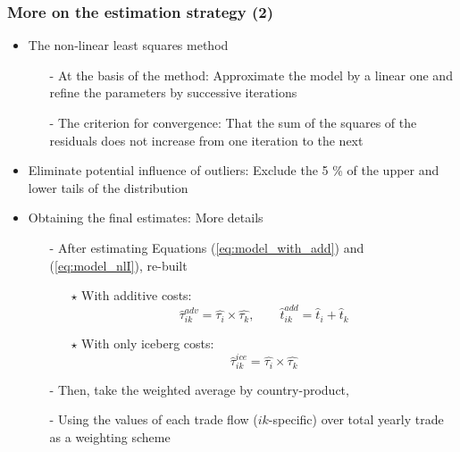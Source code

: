 \documentclass[10 pt,Helvetica, french]{beamer}
\begin{document}
\begin{frame}[label=app_method_2]
\frametitle{More on the estimation strategy (2)}
\begin{itemize}
\item The non-linear least squares method \vspace{0.1cm}
\begin{itemize}
\item[-] At the basis of the method: Approximate the model by a linear one and refine the parameters by successive iterations \vspace{0.1cm}
\item[-] The criterion for convergence: That the sum of the squares of the residuals does not increase from one iteration to the next \vspace{0.1cm}
\end{itemize}
\item Eliminate potential influence of outliers: Exclude the 5 \% of the upper and lower tails of the distribution \vspace{0.1cm}
\item Obtaining the final estimates: More details  \vspace{0.1cm}
\begin{itemize}
\item[-] After estimating Equations (\ref{eq:model_with_add}) and (\ref{eq:model_nlI}), re-built \vspace{0.1cm}
\begin{itemize}
\item[$\star$] With additive costs:
$$\widehat{\tau}^{adv}_{ik} = \widehat{\tau_{i}} \times \widehat{\tau_{k}}, \qquad \widehat{t}^{add}_{ik} = \widehat{t}_{i} + \widehat{t}_{k}$$
\item[$\star$] With only iceberg costs:
$$\widehat{\tau}^{ice}_{ik} = \widehat{\tau_{i}} \times \widehat{\tau_{k}}$$
\end{itemize}
\item[-] Then, take the weighted average by country-product, \vspace{0.1cm}
\item[-] Using the values of each trade flow ($ik$-specific) over total yearly trade as a weighting scheme
\end{itemize}
\end{itemize}
\hyperlink{slide_method}{}
\end{frame}
\end{document}
